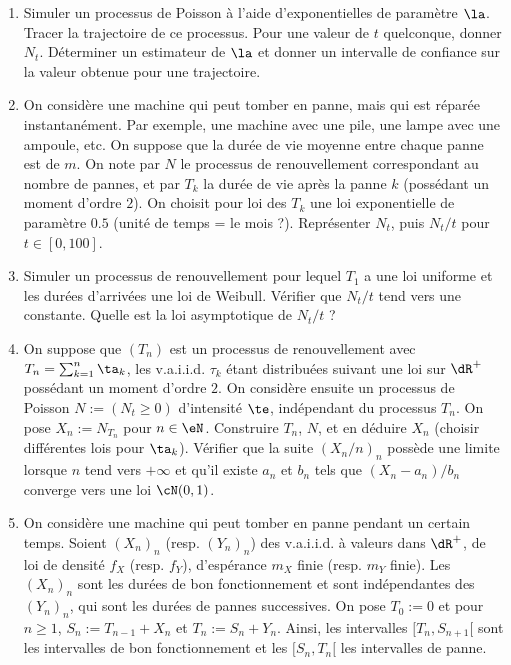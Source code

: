 \begin{enumerate} 
\item Simuler un processus de Poisson à l'aide d'exponentielles de
  paramètre $\la$. Tracer la trajectoire de ce processus. Pour une
  valeur de $t$ quelconque, donner $N_t$. Déterminer un estimateur de
  $\la$ et donner un intervalle de confiance sur la valeur obtenue
  pour une trajectoire.
\item On considère une machine qui peut tomber en panne, mais qui est
  réparée instantanément. Par exemple, une machine avec une pile, une
  lampe avec une ampoule, etc. On suppose que la durée de vie moyenne
  entre chaque panne est de $m$. On note par $N$ le processus de
  renouvellement correspondant au nombre de pannes, et par $T_k$ la
  durée de vie après la panne $k$ (possédant un moment d'ordre $2$).
  On choisit pour loi des $T_k$ une loi exponentielle de paramètre
  $0.5$ (unité de temps = le mois ?). Représenter $N_t$, puis $N_t/t$
  pour $t \in [0,100]$.
\item Simuler un processus de renouvellement pour lequel $T_1$ a une
  loi uniforme et les durées d'arrivées une loi de Weibull. Vérifier
  que $N_t/t$ tend vers une constante. Quelle est la loi asymptotique
  de $N_t/t$ ?
\item On suppose que $(T_n)$ est un processus de renouvellement avec
  $T_n=\sum_{k=1}^n \ta_k$, les v.a.i.i.d. $\tau_k$ étant distribuées
  suivant une loi sur $\dR^+$ possédant un moment d'ordre $2$. On
  considère ensuite un processus de Poisson $N:=(N_t\geq 0)$
  d'intensité $\te$, indépendant du processus $T_n$. On pose
  $X_n:=N_{T_n}$ pour $n\in\eN$. Construire $T_n$, $N$, et en déduire
  $X_n$ (choisir différentes lois pour $\ta_k$).  Vérifier que la
  suite $(X_n/n)_n$ possède une limite lorsque $n$ tend vers $+\infty$
  et qu'il existe $a_n$ et $b_n$ tels que $(X_n-a_n)/b_n$ converge
  vers une loi ${\cN}(0,1)$.
\item On considère une machine qui peut tomber en panne pendant un
  certain temps. Soient $(X_n)_n$ (resp. $(Y_n)_n$) des v.a.i.i.d. à
  valeurs dans $\dR^+$, de loi de densité $f_X$ (resp. $f_Y$),
  d'espérance $m_X$ finie (resp. $m_Y$ finie). Les $(X_n)_n$ sont les
  durées de bon fonctionnement et sont indépendantes des $(Y_n)_n$,
  qui sont les durées de pannes successives.  On pose $T_0:=0$ et pour
  $n \geq 1$, $S_n:=T_{n-1}+X_n$ et $T_n:=S_n+Y_n$.  Ainsi, les
  intervalles $[T_n,S_{n+1}[$ sont les intervalles de bon
  fonctionnement et les $[S_n,T_n[$ les intervalles de panne.
  \begin{enumerate}

\end{enumerate}
\end{enumerate}
